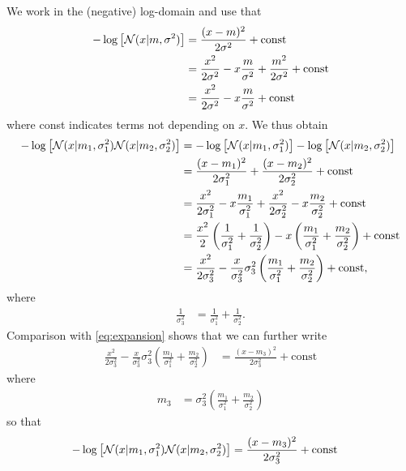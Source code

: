 \begin{exenumerate}
\begin{solution}
    We work in the (negative) log-domain and use that
    \begin{align}
      -\log \left[\mathcal{N}(x | m, \sigma^2)\right] & = \frac{ (x-m)^2 }{2 \sigma^2} + \text{const} \\
      & = \frac{ x^2}{2\sigma^2} - x \frac{m}{\sigma^2} + \frac{m^2}{2\sigma^2} + \text{const} \\
      & = \frac{ x^2}{2\sigma^2} - x \frac{m}{\sigma^2} +  \text{const} \label{eq:expansion}
    \end{align}
    where const indicates terms not depending on $x$. We thus obtain
    \begin{align}
      -\log \left[\mathcal{N}(x | m_1, \sigma_1^2) \mathcal{N}(x | m_2, \sigma_2^2) \right]  & = -\log \left[\mathcal{N}(x | m_1, \sigma_1^2)\right]-\log \left[ \mathcal{N}(x | m_2, \sigma_2^2) \right]\\
      &= \frac{ (x-m_1)^2 }{2 \sigma_1^2} + \frac{ (x-m_2)^2 }{2 \sigma_2^2} + \text{const}\\
      &= \frac{ x^2}{2\sigma_1^2} - x \frac{m_1}{\sigma_1^2} + \frac{ x^2}{2\sigma_2^2} - x \frac{m_2}{\sigma_2^2} + \text{const}\\
      &= \frac{x^2}{2} \left(\frac{1}{\sigma_1^2}+\frac{1}{\sigma_2^2}\right) -x \left( \frac{m_1}{\sigma_1^2}+\frac{m_2}{\sigma_2^2}\right) + \text{const}\\
      &=  \frac{x^2}{2 \sigma_3^2} - \frac{x}{\sigma_3^2} \sigma_3^2\left( \frac{m_1}{\sigma_1^2}+\frac{m_2}{\sigma_2^2}\right) + \text{const},
    \end{align}
    where
    \begin{align}
      \frac{1}{\sigma_3^2} &= \frac{1}{\sigma_1^2}+\frac{1}{\sigma_2^2}.
    \end{align}
    Comparison with \eqref{eq:expansion} shows that we can further write
    \begin{align}
      \frac{x^2}{2 \sigma_3^2} - \frac{x}{\sigma_3^2} \sigma_3^2\left( \frac{m_1}{\sigma_1^2}+\frac{m_2}{\sigma_2^2}\right) &=  \frac{ (x-m_3)^2 }{2 \sigma_3^2} + \text{const}
    \end{align}
    where
    \begin{align}
      m_3 & =  \sigma_3^2\left( \frac{m_1}{\sigma_1^2}+\frac{m_2}{\sigma_2^2}\right)
    \end{align}
    so that
    \begin{align}
     -\log \left[\mathcal{N}(x | m_1, \sigma_1^2) \mathcal{N}(x | m_2, \sigma_2^2) \right]  & = \frac{ (x-m_3)^2 }{2 \sigma_3^2} + \text{const}
    \end{align}

\end{solution}
\end{exenumerate}
